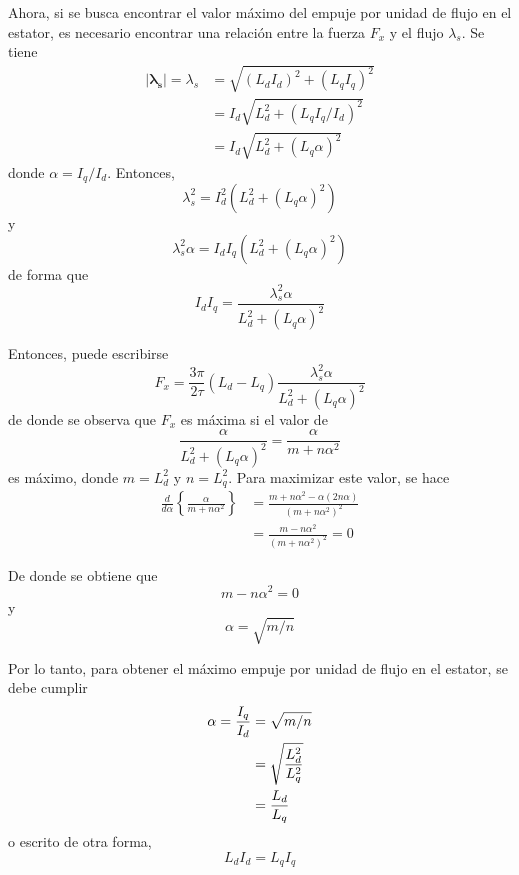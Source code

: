 Ahora, si se busca encontrar el valor máximo del empuje por unidad de flujo en el estator, es necesario encontrar una relación entre la fuerza $F_x$ y el flujo $\lambda_s$. Se tiene
\begin{align*}
|\mathbf{\lambda_s}| = \lambda_s &= \sqrt{(L_d I_d)^2+(L_q I_q)^2}\\
&= I_d\sqrt{L_d^2 + (L_q I_q/I_d)^2}\\
&= I_d\sqrt{L_d^2 + (L_q\alpha)^2}
\end{align*}
donde $\alpha = I_q/I_d$. Entonces,
\begin{equation*}
\lambda_s^2 = I_d^2(L_d^2 + (L_q \alpha)^2)
\end{equation*}
y
\begin{equation*}
\lambda_s^2 \alpha = I_d I_q(L_d^2 + (L_q \alpha)^2)
\end{equation*}
de forma que
\begin{equation*}
I_d I_q = \frac{\lambda_s^2 \alpha}{L_d^2 + (L_q \alpha)^2}
\end{equation*}

Entonces, puede escribirse
\begin{equation}
F_x = \frac{3\pi}{2\tau}(L_d - L_q)\frac{\lambda_s^2 \alpha}{L_d^2 + (L_q \alpha)^2}
\label{forcewrtlambda}
\end{equation}
de donde se observa que $F_x$ es máxima si el valor de
\begin{equation*}
\frac{\alpha}{L_d^2+(L_q\alpha)^2} = \frac{\alpha}{m+n\alpha^2}
\end{equation*}
es máximo, donde $m = L_d^2$ y $n=L_q^2$. Para maximizar este valor, se hace
\begin{align*}
\frac{d}{d\alpha}\left\lbrace \frac{\alpha}{m+n\alpha^2} \right\rbrace &= 
\frac{m+n\alpha^2-\alpha(2n\alpha)}{(m+n\alpha^2)^2}\\
&= \frac{m-n\alpha^2}{(m+n\alpha^2)^2} = 0
\end{align*}

De donde se obtiene que
\begin{equation*}
m-n\alpha^2 = 0
\end{equation*}
y
\begin{equation*}
\alpha = \sqrt{m/n}
\end{equation*}


Por lo tanto, para obtener el máximo empuje por unidad de flujo en el estator, se debe cumplir
\begin{align}
\alpha = \frac{I_q}{I_d} &= \sqrt{m/n}\notag\\
&= \sqrt{\frac{L_d^2}{L_q^2}}\notag\\
&= \frac{L_d}{L_q}
\end{align}
o escrito de otra forma,
\begin{equation}
L_d I_d = L_q I_q
\end{equation}

